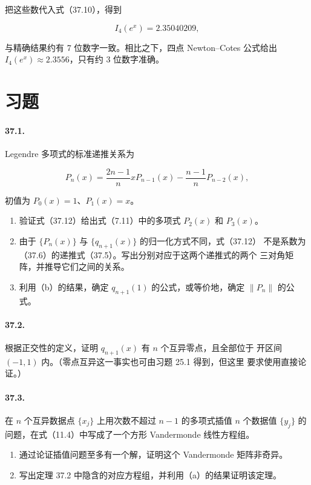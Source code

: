 \documentclass[UTF8,fontset=none,12pt]{ctexart}
\begin{document}
把这些数代入式（37.10），得到

\[
I_4(e^x)=2.35040209,
\]

与精确结果约有 7 位数字一致。相比之下，四点 Newton--Cotes 公式给出
$I_4(e^x)\approx2.3556$，只有约 3 位数字准确。

\section*{习题}

\paragraph{37.1.}
Legendre 多项式的标准递推关系为

\begin{equation}
P_n(x)=\frac{2n-1}{n}xP_{n-1}(x)
-\frac{n-1}{n}P_{n-2}(x),
\tag{37.12}
\end{equation}

初值为 $P_0(x)=1$、$P_1(x)=x$。

\begin{enumerate}[label=(\alph*)]
\item 验证式（37.12）给出式（7.11）中的多项式 $P_2(x)$ 和 $P_3(x)$。
\item 由于 $\{P_n(x)\}$ 与 $\{q_{n+1}(x)\}$ 的归一化方式不同，式（37.12）
不是系数为（37.6）的递推式（37.5）。写出分别对应于这两个递推式的两个
三对角矩阵，并推导它们之间的关系。
\item 利用（b）的结果，确定 $q_{n+1}(1)$ 的公式，或等价地，确定
$\lVert P_n\rVert$ 的公式。
\end{enumerate}

\paragraph{37.2.}
根据正交性的定义，证明 $q_{n+1}(x)$ 有 $n$ 个互异零点，且全部位于
开区间 $(-1,1)$ 内。（零点互异这一事实也可由习题 25.1 得到，但这里
要求使用直接论证。）

\paragraph{37.3.}
在 $n$ 个互异数据点 $\{x_j\}$ 上用次数不超过 $n-1$ 的多项式插值
$n$ 个数据值 $\{y_j\}$ 的问题，在式（11.4）中写成了一个方形
Vandermonde 线性方程组。

\begin{enumerate}[label=(\alph*)]
\item 通过论证插值问题至多有一个解，证明这个 Vandermonde 矩阵非奇异。
\item 写出定理 37.2 中隐含的对应方程组，并利用（a）的结果证明该定理。
\end{enumerate}
\end{document}
